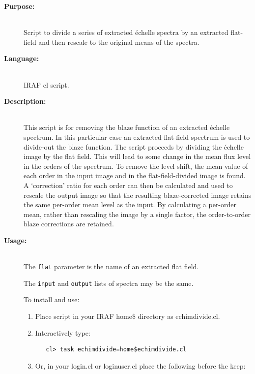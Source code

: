 \documentclass[twoside,11pt]{article}
\renewcommand{\_}{\texttt{\symbol{95}}}
\begin{document}
\begin{description}

\item [{\bf Purpose:}] \mbox{} \\
     Script to divide a series of extracted \'{e}chelle spectra by an
     extracted flat-field and then rescale to the original means of
     the spectra.

\item [{\bf Language:}] \mbox{} \\
     IRAF cl script.

\item [{\bf Description:}] \mbox{} \\
     This script is for removing the blaze function of an extracted
     \'{e}chelle spectrum.  In this particular case an extracted flat-field
     spectrum is used to divide-out the blaze function.
     The script proceeds by dividing the \'{e}chelle image by the flat field.
     This will lead to some change in the mean flux level in the
     orders of the spectrum.  To remove the level shift, the mean
     value of each order in the input image and in the flat-field-divided
     image is found.  A `correction' ratio for each order can then
     be calculated and used to rescale the output image so that the
     resulting blaze-corrected image retains the same per-order mean
     level as the input.  By calculating a per-order mean, rather than
     rescaling the image by a single factor, the order-to-order blaze
     corrections are retained.

\item [{\bf Usage:}] \mbox{} \\
     The \verb+flat+ parameter is the name of an extracted flat field.

     The \verb+input+ and \verb+output+ lists of spectra may be the same.

     To install and use:

\begin{enumerate}

\item Place script in your IRAF home\$ directory as echimdivide.cl.

\item Interactively type:

\begin{verbatim}
   cl> task echimdivide=home$echimdivide.cl
\end{verbatim}

\item Or, in your login.cl or loginuser.cl place the following
      before the keep:


\end{enumerate}
\end{description}
\end{document}
